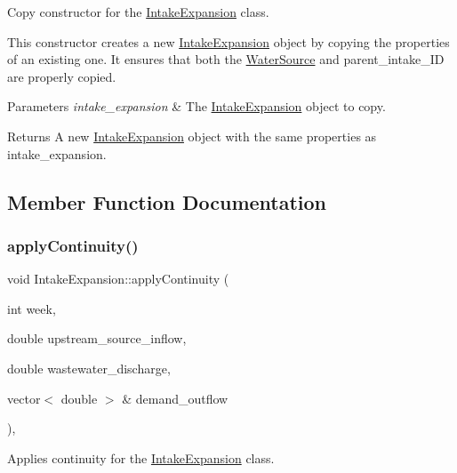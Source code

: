 Copy constructor for the \mbox{\hyperlink{classIntakeExpansion}{Intake\+Expansion}} class. 

This constructor creates a new {\ttfamily \mbox{\hyperlink{classIntakeExpansion}{Intake\+Expansion}}} object by copying the properties of an existing one. It ensures that both the {\ttfamily \mbox{\hyperlink{classWaterSource}{Water\+Source}}} and {\ttfamily parent\+\_\+intake\+\_\+\+ID} are properly copied.


\begin{DoxyParams}{Parameters}
{\em intake\+\_\+expansion} & The {\ttfamily \mbox{\hyperlink{classIntakeExpansion}{Intake\+Expansion}}} object to copy.\\
\hline
\end{DoxyParams}
\begin{DoxyReturn}{Returns}
A new {\ttfamily \mbox{\hyperlink{classIntakeExpansion}{Intake\+Expansion}}} object with the same properties as {\ttfamily intake\+\_\+expansion}. 
\end{DoxyReturn}


\subsection{Member Function Documentation}
\mbox{\label{classIntakeExpansion_a8686b58c65444182ba19b783fc6ff77f}} 
\subsubsection{\texorpdfstring{apply\+Continuity()}{applyContinuity()}}
{\footnotesize\ttfamily void Intake\+Expansion\+::apply\+Continuity (\begin{DoxyParamCaption}\item[{int}]{week,  }\item[{double}]{upstream\+\_\+source\+\_\+inflow,  }\item[{double}]{wastewater\+\_\+discharge,  }\item[{vector$<$ double $>$ \&}]{demand\+\_\+outflow }\end{DoxyParamCaption})\hspace{0.3cm}{\ttfamily [override]}, {\ttfamily [virtual]}}



Applies continuity for the \mbox{\hyperlink{classIntakeExpansion}{Intake\+Expansion}} class. 

